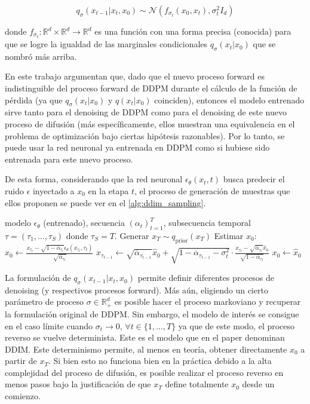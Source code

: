 \begin{equation*}
    q_\sigma(x_{t-1}|x_t,x_0)\sim\mathcal{N}\left(f_{\sigma_t}(x_0,x_t),\sigma_t^2 I_d\right)
\end{equation*}

donde $f_{\sigma_t}:\mathbb{R}^d\times\mathbb{R}^d\to\mathbb{R}^d$ es una función con una forma precisa (conocida) para que se logre la igualdad de las marginales condicionales $q_\sigma(x_t|x_0)$ que se nombró más arriba.

En este trabajo argumentan que, dado que el nuevo proceso forward es indistinguible del proceso forward de DDPM durante el cálculo de la función de pérdida (ya que $q_\sigma(x_t|x_0)$ y $q(x_t|x_0)$ coinciden), entonces el modelo entrenado sirve tanto para el denoising de DDPM como para el denoising de este nuevo proceso de difusión (más específicamente, ellos muestran una equivalencia en el problema de optimización bajo ciertas hipótesis razonables). Por lo tanto, se puede usar la red neuronal ya entrenada en DDPM como si hubiese sido entrenada para este nuevo proceso.

De esta forma, considerando que la red neuronal $\epsilon_\theta(x_t,t)$ busca predecir el ruido $\epsilon$ inyectado a $x_0$ en la etapa $t$, el proceso de generación de muestras que ellos proponen se puede ver en el \autoref{alg:ddim_sampling}.

\begin{algorithm}
    \caption{Generación usando DDIM}
   \label{alg:ddim_sampling}
   \begin{algorithmic}[1]
   \Require modelo $\epsilon_\theta$ (entrenado), secuencia $(\alpha_t)_{t=1}^T$, subsecuencia temporal $\tau = (\tau_1, ..., \tau_S)$ donde $\tau_S = T$.
   \State Generar $x_T \sim q_{\text{prior}}(x_T)$
   \State Estimar $x_0$: $\hat{x}_0 \gets \frac{x_{\tau_t} - \sqrt{1-\overline{\alpha}_{\tau_t}}\epsilon_\theta(x_{\tau_t},\tau_t)}{\sqrt{\overline{\alpha}_{\tau_t}}}$
   \State $x_{\tau_{t-1}} \gets \sqrt{\overline{\alpha}_{\tau_{t-1}}}\hat{x}_0 + \sqrt{1-\overline{\alpha}_{\tau_{t-1}}-\sigma_t^2}\cdot\frac{x_{\tau_t}-\sqrt{\overline{\alpha}_{\tau_t}}\hat{x}_0}{\sqrt{1-\overline{\alpha}_{\tau_t}}}$
   \EndIf
   \EndFor
   \State \Return $x_0 \gets \hat{x}_0$
   \end{algorithmic}
\end{algorithm}

La formulación de $q_\sigma(x_{t-1}|x_t,x_0)$ permite definir diferentes procesos de denoising (y respectivos procesos forward). Más aún, eligiendo un cierto parámetro de proceso $\sigma\in\mathbb{R}^d_+$ es posible hacer el proceso markoviano y recuperar la formulación original de DDPM. Sin embargo, el modelo de interés se consigue en el caso límite cuando $\sigma_t\to 0,\,\forall t\in\{1,\ldots, T\}$ ya que de este modo, el proceso reverso se vuelve determinista. Este es el modelo que en el paper denominan DDIM. Este determinismo permite, al menos en teoría, obtener directamente $x_0$ a partir de $x_T$. Si bien esto no funciona bien en la práctica debido a la alta complejidad del proceso de difusión, es posible realizar el proceso reverso en menos pasos bajo la justificación de que $x_T$ define totalmente $x_0$ desde un comienzo.

